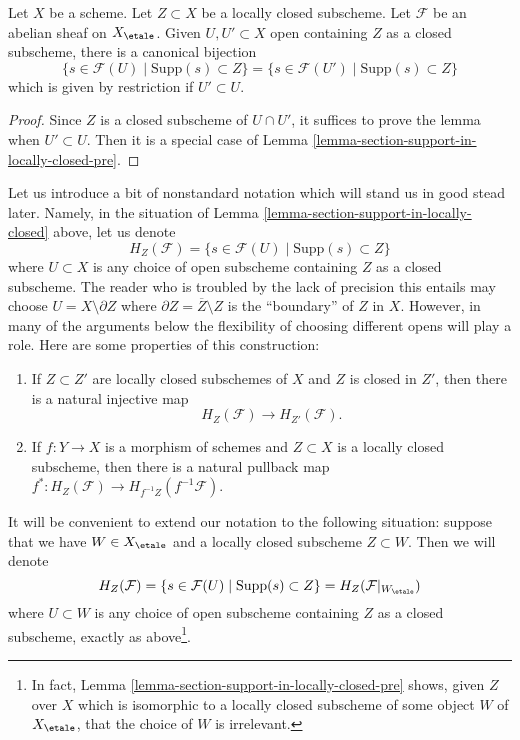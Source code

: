 \begin{lemma}
\label{lemma-section-support-in-locally-closed}
Let $X$ be a scheme. Let $Z \subset X$ be a locally closed subscheme.
Let $\mathcal{F}$ be an abelian sheaf on $X_\etale$. Given
$U, U' \subset X$ open containing $Z$ as a closed subscheme,
there is a canonical bijection
$$
\{s \in \mathcal{F}(U) \mid \text{Supp}(s) \subset Z\} =
\{s \in \mathcal{F}(U') \mid \text{Supp}(s) \subset Z\}
$$
which is given by restriction if $U' \subset U$.
\end{lemma}

\begin{proof}
Since $Z$ is a closed subscheme of $U \cap U'$, it suffices to
prove the lemma when $U' \subset U$. Then it is a special case
of Lemma \ref{lemma-section-support-in-locally-closed-pre}.
\end{proof}

\noindent
Let us introduce a bit of nonstandard notation which will stand us
in good stead later. Namely, in the situation of
Lemma \ref{lemma-section-support-in-locally-closed} above, let us denote
$$
H_Z(\mathcal{F}) = \{s \in \mathcal{F}(U) \mid \text{Supp}(s) \subset Z\}
$$
where $U \subset X$ is any choice of open subscheme containing $Z$ as a closed
subscheme. The reader who is troubled by the lack of precision this entails
may choose $U = X \setminus \partial Z$ where
$\partial Z = \overline{Z}\setminus Z$ is the ``boundary'' of $Z$ in $X$.
However, in many of the arguments below the flexibility of choosing
different opens will play a role. Here are some properties of this
construction:
\begin{enumerate}
\item
\label{item-inclusion}
If $Z \subset Z'$ are locally closed subschemes of $X$ and $Z$ is
closed in $Z'$, then there is a natural injective map
$$
H_Z(\mathcal{F}) \to H_{Z'}(\mathcal{F}).
$$
\item
\label{item-pullback}
If $f : Y \to X$ is a morphism of schemes and $Z \subset X$ is a locally
closed subscheme, then there is a natural
pullback map $f^* : H_Z(\mathcal{F}) \to H_{f^{-1}Z}(f^{-1}\mathcal{F})$.
\end{enumerate}
It will be convenient to extend our notation to the following situation:
suppose that we have $W \in X_\etale$ and a locally closed subscheme
$Z \subset W$. Then we will denote
$$
H_Z(\mathcal{F}) =
\{s \in \mathcal{F}(U) \mid \text{Supp}(s) \subset Z\} =
H_Z(\mathcal{F}|_{W_\etale})
$$
where $U \subset W$ is any choice of open subscheme containing $Z$
as a closed subscheme, exactly as above\footnote{In fact,
Lemma \ref{lemma-section-support-in-locally-closed-pre}
shows, given $Z$ over $X$ which is isomorphic to a locally closed
subscheme of some object $W$ of $X_\etale$, that
the choice of $W$ is irrelevant.}.








